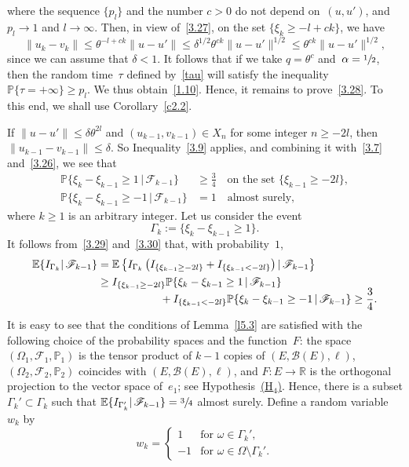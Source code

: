 \documentclass[11pt]{article}
\theoremstyle{plain}
\theoremstyle{definition}
\let\mathcal\mathscr
\theoremstyle{plain}
\numberwithin{equation}{section}
\let\ty\infty
\newcommand{\R}{{\mathbb R}}
\newcommand{\IP}{{\mathbb P}}
\newcommand{\E}{{\mathbb E}}
\newcommand{\BB}{{\mathcal B}}
\newcommand{\FF}{{\mathcal F}}
\begin{document}
where the sequence $\{p_l\}$ and the number $c>0$ do not depend on~$(u,u')$, and $p_l\to 1$ and $l\to \ty$. Then, in view of~\eqref{3.27}, on the set $\{\xi_k\ge -l+ck\}$, we have
\[
\|u_k-v_k\|\le \theta^{-l+ck}\|u-u'\|
\le \delta^{1/2}\theta^{ck}\|u-u'\|^{1/2}\le \theta^{ck}\|u-u'\|^{1/2},
\]
since we can assume that $\delta<1$.
It follows that if we take $q=\theta^c$ and~$\alpha=\sfrac12$, then the random time~$\tau$ defined by~\eqref{tau} will satisfy the inequality $\IP\{\tau=+\infty\}\ge p_l$. We thus obtain~\eqref{1.10}. Hence, it remains to prove~\eqref{3.28}. To this end, we shall use Corollary~\ref{c2.2}.

If $\|u-u'\|\le \delta\theta^{2l}$ and $(u_{k-1}, v_{k-1})\in X_{n}$ for some integer $n\ge -2l$, then \hbox{$\|u_{k-1}-v_{k-1}\|\le\delta$}. So Inequality~\eqref{3.9} applies, and combining it with~\eqref{3.7} and~\eqref{3.26}, we see that
\begin{align}
\IP\{\xi_k-\xi_{k-1}\ge 1\,|\,\FF_{k-1}\}&\ge \frac34\quad
\text{on the set $\{\xi_{k-1}\ge -2l$\}},\label{3.29}\\
\IP\{\xi_k-\xi_{k-1}\ge -1\,|\,\FF_{k-1}\}&=1\quad
\text{almost surely},\label{3.30}
\end{align}
where $k\ge1$ is an arbitrary integer. Let us consider the event
\[
\Gamma_k:=\{\xi_k-\xi_{k-1}\ge 1 \}.
\]
It follows from~\eqref{3.29} and~\eqref{3.30} that, with probability~$1$,
\begin{align*}
\E\{I_{\Gamma_k}|\,\FF_{k-1}\}&=\E\left\{I_{\Gamma_k} \left(I_{\{\xi_{k-1}\ge -2l\}}
+I_{\{\xi_{k-1}< -2l\}}\right)|\,\FF_{k-1}\right\}\\
&\ge I_{\{\xi_{k-1}\ge -2l\}}\IP\{\xi_k-\xi_{k-1}\ge 1\,|\,\FF_{k-1}\}
\\[-5pt]
&\hspace*{2cm} +I_{\{\xi_{k-1}< -2l\}}\IP\{\xi_k-\xi_{k-1}\ge -1\,|\,\FF_{k-1}\}\ge \frac34.
\end{align*}
It is easy to see that the conditions of Lemma~\ref{l5.3} are satisfied with the following choice of the probability spaces and the function~$F$: the space $(\Omega_1,\FF_1,\IP_1)$ is the tensor product of $k-1$ copies of $(E,\BB(E),\ell)$, $(\Omega_2,\FF_2,\IP_2)$ coincides with $(E,\BB(E),\ell)$, and $F:E\to\R$ is the orthogonal projection to the vector space of~$e_1$; see Hypothesis~\hyperlink{H4}{(H$_4$)}. Hence, there is a subset $\Gamma_k'\subset\Gamma_k$ such that $\E\{I_{\Gamma_k'}|\,\FF_{k-1}\}=\sfrac34$ almost surely. Define a random variable~$w_k$ by
\[
w_k=
\begin{cases}
1&\text{for $\omega\in\Gamma_k'$},\\[3pt]
-1&\text{for $\omega\in\Omega\setminus\Gamma_k'$}.
\end{cases}
\]
\end{document}
